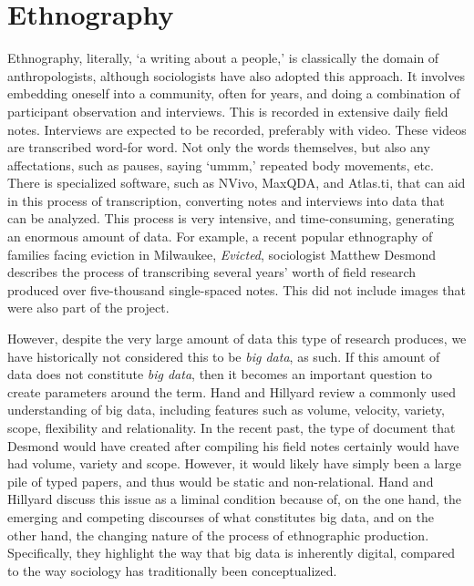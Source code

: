 \documentclass[sigconf]{acmart}
\begin{document}
\section{Ethnography}
Ethnography, literally, `a writing about a people,' is classically the domain of anthropologists, although sociologists have also adopted this approach.  It involves embedding oneself into a community, often for years, and doing a combination of participant observation and interviews.  This is recorded in extensive daily field notes.  Interviews are expected to be recorded, preferably with video.  These videos are transcribed word-for word.  Not only the words themselves, but also any affectations, such as pauses, saying `ummm,' repeated body movements, etc.  There is specialized software, such as NVivo, MaxQDA, and Atlas.ti, that can aid in this process of transcription, converting notes and interviews into data that can be analyzed. \cite{hand14} This process is very intensive, and time-consuming, generating an enormous amount of data.  For example, a recent popular ethnography of families facing eviction in Milwaukee, {\em Evicted}, sociologist Matthew Desmond describes the process of transcribing several years' worth of field research produced over five-thousand single-spaced notes.  \cite{desmond16}  This did not include images that were also part of the project.  

However, despite the very large amount of data this type of research produces, we have historically not considered this to be {\em big data}, as such.  If this amount of data does not constitute {\em big data}, then it becomes an important question to create parameters around the term. Hand and Hillyard review a commonly used understanding of big data, including features such as volume, velocity, variety, scope, flexibility and relationality. \cite {hand14} In the recent past, the type of document that Desmond would have created after compiling his field notes certainly would have had volume, variety and scope.  However, it would likely have simply been a large pile of typed papers, and thus would be static and non-relational.  Hand and Hillyard discuss this issue as a liminal condition because of, on the one hand, the emerging and competing discourses of what constitutes big data, and on the other hand, the changing nature of the process of ethnographic production.  Specifically, they highlight the way that big data is inherently digital, compared to the way sociology has traditionally been conceptualized.  
\end{document}
